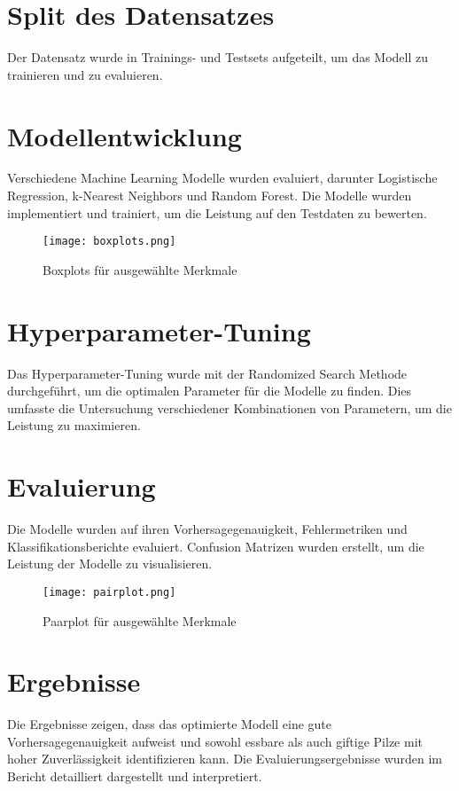 \documentclass{article}
\begin{document}
\section{Split des Datensatzes}
Der Datensatz wurde in Trainings- und Testsets aufgeteilt, um das Modell zu trainieren und zu evaluieren.

\section{Modellentwicklung}
Verschiedene Machine Learning Modelle wurden evaluiert, darunter Logistische Regression, k-Nearest Neighbors und Random Forest. Die Modelle wurden implementiert und trainiert, um die Leistung auf den Testdaten zu bewerten.

\begin{figure}[htbp]
    \centering
    \texttt{[image: boxplots.png]}
    \caption{Boxplots für ausgewählte Merkmale}
\end{figure}

\section{Hyperparameter-Tuning}
Das Hyperparameter-Tuning wurde mit der Randomized Search Methode durchgeführt, um die optimalen Parameter für die Modelle zu finden. Dies umfasste die Untersuchung verschiedener Kombinationen von Parametern, um die Leistung zu maximieren.

\section{Evaluierung}
Die Modelle wurden auf ihren Vorhersagegenauigkeit, Fehlermetriken und Klassifikationsberichte evaluiert. Confusion Matrizen wurden erstellt, um die Leistung der Modelle zu visualisieren.

\begin{figure}[htbp]
    \centering
    \texttt{[image: pairplot.png]}
    \caption{Paarplot für ausgewählte Merkmale}
\end{figure}

\section{Ergebnisse}
Die Ergebnisse zeigen, dass das optimierte Modell eine gute Vorhersagegenauigkeit aufweist und sowohl essbare als auch giftige Pilze mit hoher Zuverlässigkeit identifizieren kann. Die Evaluierungsergebnisse wurden im Bericht detailliert dargestellt und interpretiert.
\end{document}
